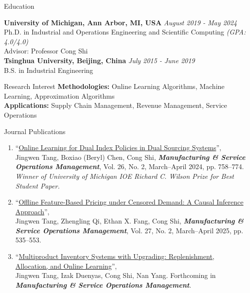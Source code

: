 \documentclass{resume}
\begin{document}

\begin{rSection}{Education}

{\bf University of Michigan, Ann Arbor, MI, USA} \hfill {\em August 2019 - May 2024} 
\\ Ph.D. in Industrial and Operations Engineering and Scientific Computing \hfill{\em  (GPA: 4.0/4.0)}
\\Advisor: Professor Cong Shi \hfill
\\{\bf Tsinghua University, Beijing, China} \hfill {\em July 2015 - June 2019} 
\\ B.S. in Industrial Engineering
\end{rSection}

\begin{rSection}{Research Interest}
 {\bf Methodologies: } Online Learning Algorithms, Machine Learning, Approximation Algorithms\\
 {\bf Applications: } Supply Chain Management, Revenue Management, Service Operations
\end{rSection}


\begin{rSection}{Journal Publications}
\begin{enumerate}
    \item ``\href{https://pubsonline.informs.org/doi/10.1287/msom.2022.0323}{Online Learning for Dual Index Policies in Dual Sourcing Systems}'', \\ Jingwen Tang, Boxiao (Beryl) Chen, Cong Shi, \emph{\textbf{Manufacturing \& Service Operations Management}}, Vol. 26, No. 2, March–April 2024, pp. 758–774. \\
    {\it Winner of University of Michigan IOE Richard C. Wilson Prize for Best Student Paper.}

  \item ``\href{https://pubsonline.informs.org/doi/10.1287/msom.2024.1061}{Offline Feature-Based Pricing under Censored Demand: A Causal Inference Approach}'', \\Jingwen Tang, Zhengling Qi, Ethan X. Fang, Cong Shi, \emph{\textbf{Manufacturing \& Service Operations Management}}, Vol. 27, No. 2, March–April 2025, pp. 535–553. 

  \item ``\href{https://papers.ssrn.com/sol3/papers.cfm?abstract_id=4781604}{Multiproduct Inventory Systems with Upgrading: Replenishment, Allocation, and Online Learning}'', \\Jingwen Tang, Izak Duenyas, Cong Shi, Nan Yang. Forthcoming in \emph{\textbf{Manufacturing \& Service Operations Management}}. 

\end{enumerate}
\end{rSection}
\end{document}
